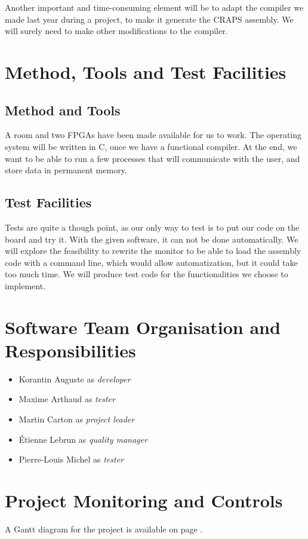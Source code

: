 \documentclass{article}
\begin{document}
    Another important and time-consuming element will be to adapt the compiler
    we made last year during a project, to make it generate the CRAPS assembly.
    We will surely need to make other modifications to the compiler.

  \section{Method, Tools and Test Facilities}
    \subsection{Method and Tools}
    A room and two FPGAs have been made available for us to work.
    The operating system will be written in C, once we have a functional
    compiler.
    At the end, we want to be able to run a few processes that will communicate
    with the user, and store data in permanent memory.

     \subsection{Test Facilities}
    Tests are quite a though point, as our only way to test is to put
    our code on the board and try it. With the given software, it can not be
    done automatically.
    We will explore the feasibility to rewrite the monitor to be able to load
    the assembly code with a command line, which would allow automatization, but
    it could take too much time.
    We will produce test code for the functionalities we choose to implement.

  \section{Software Team Organisation and Responsibilities}
    \begin{itemize}
      \item Korantin Auguste as \textit{developer}
      \item Maxime Arthaud as \textit{tester}
      \item Martin Carton as \textit{project leader}
      \item Étienne Lebrun as \textit{quality manager}
      \item Pierre-Louis Michel as \textit{tester}
    \end{itemize}

  \section{Project Monitoring and Controls}
    A Gantt diagram for the project is available on page \pageref{fig:gantt}.
\end{document}
